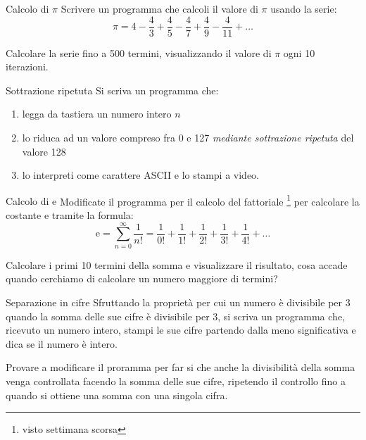\documentclass[aspectratio=169, ]{beamer}
\begin{document}
\begin{frame}{Calcolo di $\pi$}
Scrivere un programma che calcoli il valore di $\pi$ usando la serie:
\[ \pi = 4 - \frac{4}{3} + \frac{4}{5} - \frac{4}{7} + \frac{4}{9} - \frac{4}{11} + \dots \]

Calcolare la serie fino a 500 termini, visualizzando il valore di $\pi$ ogni 10 iterazioni.
\end{frame}

\begin{frame}{Sottrazione ripetuta}
Si scriva un programma che:
    \begin{enumerate}
            \item legga da tastiera un numero intero $n$
            \item lo riduca ad un valore compreso fra 0 e 127 \emph{mediante sottrazione ripetuta} del valore 128
            \item lo interpreti come carattere ASCII e lo stampi a video.
    \end{enumerate}
\end{frame}

\begin{frame}{Calcolo di $\mathrm{e}$}
    Modificate il programma per il calcolo del fattoriale \footnote{visto settimana scorsa} per calcolare la costante $\mathrm{e}$ tramite la formula:
    \[ \mathrm{e} = \sum_{n=0}^{\infty} \frac{1}{n!} = \frac{1}{0!} + \frac{1}{1!} + \frac{1}{2!} + \frac{1}{3!} +
    \frac{1}{4!} + \dots \]

    Calcolare i primi 10 termini della somma e visualizzare il risultato, cosa accade quando cerchiamo di calcolare
    un numero maggiore di termini?
\end{frame}

\begin{frame}{Separazione in cifre}
    Sfruttando la proprietà per cui un numero è divisibile per 3 quando la somma delle sue cifre è divisibile per 3, si
    scriva un programma che, ricevuto un numero intero, stampi le sue cifre partendo dalla meno significativa e dica se
    il numero è intero.

    Provare a modificare il proramma per far si che anche la divisibilità della somma venga controllata facendo la somma
    delle sue cifre, ripetendo il controllo fino a quando si ottiene una somma con una singola cifra.
\end{frame}

\end{document}
